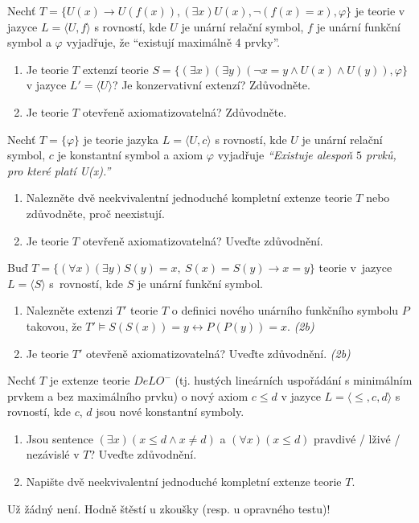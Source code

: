 \documentclass[a4paper,12pt]{article}
\begin{document}
\medskip\begin{problem}
    Nechť $T = \{U(x) \to U(f(x)), (\exists x)U(x), \neg (f(x) = x), \varphi\}$ je teorie v jazyce $L = \langle U, f \rangle$ s rovností, kde $U$ je unární relační symbol, $f$ je unární funkční symbol a $\varphi$ vyjadřuje, že ``existují maximálně 4 prvky''.
    \begin{enumerate}
    \item Je teorie $T$ extenzí teorie $S = \{ (\exists x)(\exists y)(\neg x = y \land U(x) \land U(y)), \varphi \}$ v jazyce $L' = \langle U \rangle$? Je konzervativní extenzí? Zdůvodněte.
    \item Je teorie $T$ otevřeně axiomatizovatelná? Zdůvodněte.
    \end{enumerate} 
\end{problem}

\medskip\begin{problem}
Nechť $T=\{\varphi\}$ je teorie jazyka $L=\langle U, c \rangle$ s rovností, kde $U$ je unární relační symbol, $c$ je konstantní symbol a axiom $\varphi$ vyjadřuje \emph{``Existuje alespoň $5$ prvků, pro které platí U(x).''}
\begin{enumerate}
\item Nalezněte dvě neekvivalentní jednoduché kompletní extenze teorie $T$ nebo zdůvodněte, proč neexistují.
\item Je teorie $T$ otevřeně axiomatizovatelná? Uveďte zdůvodnění.
\end{enumerate}
\end{problem}


\medskip\begin{problem} %
    Buď $T=\{(\forall x)(\exists y) S(y)=x,\ S(x)=S(y)\to x=y\}$ teorie v~jazyce $L=\langle S\rangle$ s~rovností, kde $S$ je unární funkční symbol.
    \begin{enumerate}
    \item Nalezněte extenzi $T'$ teorie $T$ o definici nového unárního funkčního symbolu $P$ takovou, že $T' \models S(S(x))=y \leftrightarrow P(P(y))=x$. {\it (2b)}
    \item Je teorie $T'$ otevřeně axiomatizovatelná? Uveďte zdůvodnění. {\it (2b)}
    \end{enumerate} 
\end{problem} 


\medskip\begin{problem}
    Nechť $T$ je extenze teorie $DeLO^-$ (tj. hustých lineárních uspořádání s minimálním prvkem a bez maximálního prvku) o nový axiom $c \le d$ v jazyce $L=\langle \le,c,d\rangle$ s rovností, kde $c$, $d$ jsou nové konstantní symboly.
    \begin{enumerate}
    \item Jsou sentence $(\exists x)(x\le d \wedge x \ne d)$ a $(\forall x)(x \le d)$ pravdivé / lživé / nezávislé v $T$? Uveďte zdůvodnění.
    \item Napište dvě neekvivalentní jednoduché kompletní extenze teorie $T$.
    \end{enumerate} 
\end{problem}


\medskip\begin{ukol}
Už žádný není. Hodně štěstí u zkoušky (resp. u opravného testu)!
\end{ukol}
\end{document}
